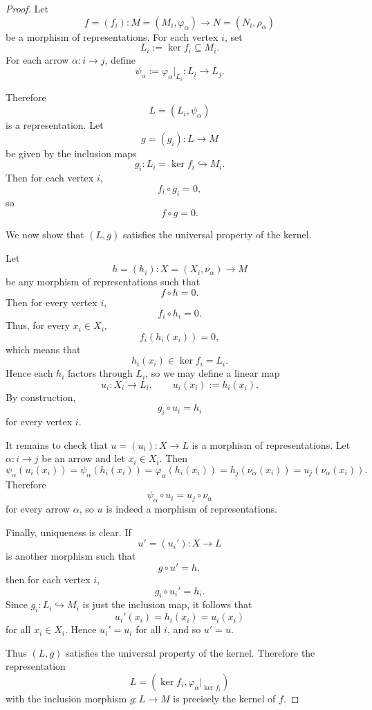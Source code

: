 \documentclass[11pt, a4paper]{report}
\begin{document}
\begin{proof}
    Let
    \[
        f=(f_i):M=(M_i,\varphi_\alpha)\longrightarrow N=(N_i,\rho_\alpha)
    \]
    be a morphism of representations. For each vertex $i$, set
    \[
        L_i:=\ker f_i \subseteq M_i.
    \]
    For each arrow $\alpha:i\to j$, define
    \[
        \psi_\alpha:=\varphi_\alpha|_{L_i}:L_i\to L_j.
    \]

    Therefore
    \[
        L=(L_i,\psi_\alpha)
    \]
    is a representation. Let
    \[
        g=(g_i):L\to M
    \]
    be given by the inclusion maps
    \[
        g_i:L_i=\ker f_i \hookrightarrow M_i.
    \]
    Then for each vertex $i$,
    \[
        f_i\circ g_i=0,
    \]
    so
    \[
        f\circ g=0.
    \]

    We now show that $(L,g)$ satisfies the universal property of the kernel.

    Let
    \[
        h=(h_i):X=(X_i,\nu_\alpha)\to M
    \]
    be any morphism of representations such that
    \[
        f\circ h=0.
    \]
    Then for every vertex $i$,
    \[
        f_i\circ h_i=0.
    \]
    Thus, for every $x_i\in X_i$,
    \[
        f_i(h_i(x_i))=0,
    \]
    which means that
    \[
        h_i(x_i)\in \ker f_i=L_i.
    \]
    Hence each $h_i$ factors through $L_i$, so we may define a linear map
    \[
        u_i:X_i\to L_i,\qquad u_i(x_i):=h_i(x_i).
    \]
    By construction,
    \[
        g_i\circ u_i=h_i
    \]
    for every vertex $i$.

    It remains to check that $u=(u_i):X\to L$ is a morphism of representations. Let $\alpha:i\to j$ be an arrow and let $x_i\in X_i$. Then
    \[
        \psi_\alpha(u_i(x_i))
        =\psi_\alpha(h_i(x_i))
        =\varphi_\alpha(h_i(x_i))
        =h_j(\nu_\alpha(x_i))
        =u_j(\nu_\alpha(x_i)).
    \]
    Therefore
    \[
        \psi_\alpha\circ u_i=u_j\circ \nu_\alpha
    \]
    for every arrow $\alpha$, so $u$ is indeed a morphism of representations.

    Finally, uniqueness is clear. If
    \[
        u'=(u_i'):X\to L
    \]
    is another morphism such that
    \[
        g\circ u'=h,
    \]
    then for each vertex $i$,
    \[
        g_i\circ u_i'=h_i.
    \]
    Since $g_i:L_i\hookrightarrow M_i$ is just the inclusion map, it follows that
    \[
        u_i'(x_i)=h_i(x_i)=u_i(x_i)
    \]
    for all $x_i\in X_i$. Hence $u_i'=u_i$ for all $i$, and so $u'=u$.

    Thus $(L,g)$ satisfies the universal property of the kernel. Therefore the representation
    \[
        L=(\ker f_i,\varphi_\alpha|_{\ker f_i})
    \]
    with the inclusion morphism $g:L\to M$ is precisely the kernel of $f$.


\end{proof}
\end{document}
